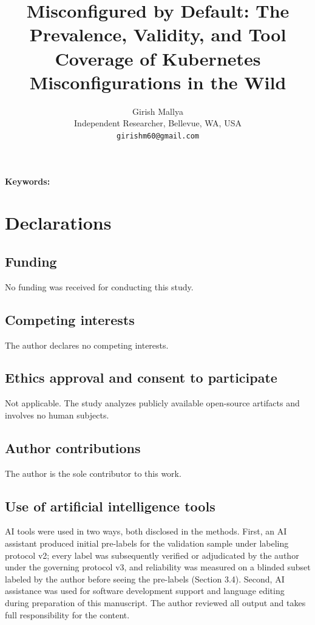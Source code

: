 \documentclass[11pt]{article}
\title{Misconfigured by Default: The Prevalence, Validity, and Tool Coverage of Kubernetes Misconfigurations in the Wild}
\author{Girish Mallya\\
Independent Researcher, Bellevue, WA, USA\\
\texttt{girishm60@gmail.com}}
\date{}
\begin{document}
\maketitle

\begin{abstract}
\end{abstract}

\noindent\textbf{Keywords:} %


\section*{Declarations}

\subsection*{Funding}
No funding was received for conducting this study.

\subsection*{Competing interests
}
The author declares no competing interests.

\subsection*{Ethics approval and consent to participate}
Not applicable. The study analyzes publicly available open-source artifacts
and involves no human subjects.

\subsection*{Author contributions}
The author is the sole contributor to this work.

\subsection*{Use of artificial intelligence tools}
AI tools were used in two ways, both disclosed in the methods. First, an AI
assistant produced initial pre-labels for the validation sample under
labeling protocol v2; every label was subsequently verified or adjudicated
by the author under the governing protocol v3, and reliability was measured
on a blinded subset labeled by the author before seeing the pre-labels
(Section 3.4). Second, AI assistance was used for software development
support and language editing during preparation of this manuscript. The
author reviewed all output and takes full responsibility for the content.

\nocite{CISBenchmark,NSA2022,K8sPSS,ToolDocs}


\end{document}
